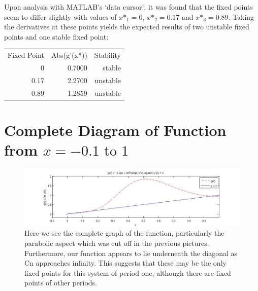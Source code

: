 Upon analysis with MATLAB's `data cursor', it was found that the fixed points seem to differ slightly with values of $x\text{*}_{1} = 0$, $x\text{*}_{2} = 0.17$ and $x\text{*}_{3} = 0.89$. Taking the derivatives at these points yields the expected results of two unstable fixed points and one stable fixed point: 

\begin{table}[h]
\centering
\begin{tabular}{rrr}
Fixed Point & Abs(g'(x*)) & Stability \\
0           & 0.7000      & stable    \\
0.17        & 2.2700      & unstable  \\
0.89        & 1.2859      & unstable   
\end{tabular}
\end{table}

\section*{Complete Diagram of Function from $x = -0.1 \text{ to } 1$}
\begin{figure}[H]
    \begin{center}
    \includegraphics[width=\linewidth]{P1_CompleteGraph}
    \end{center}
    \caption{Here we see the complete graph of the function, particularly the parabolic aspect which was cut off in the previous pictures. Furthermore, our function appears to lie underneath the diagonal as Cn approaches infinity. This suggests that these may be the only fixed points for this system of period one, although there are fixed points of other periods.}
    \label{figure:2.1}
\end{figure}
